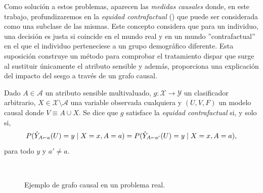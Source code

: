 \documentclass[oneside,openright,titlepage,numbers=noenddot,openany,headinclude,footinclude=true,
cleardoublepage=empty,abstractoff,BCOR=5mm,paper=a4,fontsize=12pt,main=spanish]{scrreprt}
\begin{document}
Como solución a estos problemas, aparecen las \textit{medidas causales} donde, en este trabajo, profundizaremos en la \textit{equidad contrafactual} (\cite{worlds2017}) que puede ser considerada como una subclase de las mismas. Este concepto considera que para un individuo, una decisión es justa si coincide en el mundo real y en un mundo ''contrafactual'' en el que el individuo perteneciese a un grupo demográfico diferente. Esta suposición construye un método para comprobar el tratamiento dispar que surge al sustituir únicamente el atributo sensible y además, proporciona una explicación del impacto del sesgo a través de un grafo causal.\\

\begin{definition}
Dado $A\in \mathcal{A}$ un atributo sensible multivaluado, $g\colon \mathcal{X} \to \mathcal{Y}$ un clasificador arbitrario, $X \in \mathcal{X}\setminus \mathcal{A}$ una variable observada cualquiera y $(U,V,F)$ un modelo causal donde $V \equiv A \cup X$. Se dice que $g$ satisface la \textit{equidad contrafactual} si, y solo si, $$P(\hat{Y}_{A\shortleftarrow a}(U)=y \mid X=x, A=a)=P(\hat{Y}_{A\shortleftarrow a'}(U)=y \mid X=x, A=a),$$
para todo $y$ y $a'\neq a$. 
\end{definition}\

\begin{figure}[h]
\centering   
{}\qquad
{}\qquad
{}
\caption{Ejemplo de grafo causal en un problema real.}
\label{fig:caugraph}
\end{figure}
\end{document}
